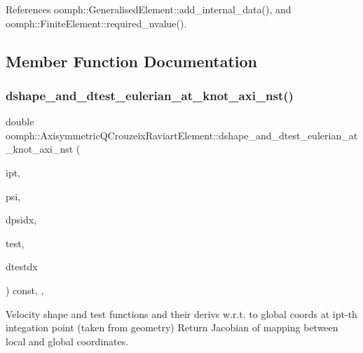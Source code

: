 References oomph\+::\+Generalised\+Element\+::add\+\_\+internal\+\_\+data(), and oomph\+::\+Finite\+Element\+::required\+\_\+nvalue().



\subsection{Member Function Documentation}
\mbox{\label{classoomph_1_1AxisymmetricQCrouzeixRaviartElement_a84026f3c225ef35731a04cc5866c7d6b}} 
\subsubsection{\texorpdfstring{dshape\+\_\+and\+\_\+dtest\+\_\+eulerian\+\_\+at\+\_\+knot\+\_\+axi\+\_\+nst()}{dshape\_and\_dtest\_eulerian\_at\_knot\_axi\_nst()}\hspace{0.1cm}{\footnotesize\ttfamily [1/2]}}
{\footnotesize\ttfamily double oomph\+::\+Axisymmetric\+Q\+Crouzeix\+Raviart\+Element\+::dshape\+\_\+and\+\_\+dtest\+\_\+eulerian\+\_\+at\+\_\+knot\+\_\+axi\+\_\+nst (\begin{DoxyParamCaption}\item[{const unsigned \&}]{ipt,  }\item[{\hyperlink{classoomph_1_1Shape}{Shape} \&}]{psi,  }\item[{\hyperlink{classoomph_1_1DShape}{D\+Shape} \&}]{dpsidx,  }\item[{\hyperlink{classoomph_1_1Shape}{Shape} \&}]{test,  }\item[{\hyperlink{classoomph_1_1DShape}{D\+Shape} \&}]{dtestdx }\end{DoxyParamCaption}) const\hspace{0.3cm}{\ttfamily [inline]}, {\ttfamily [protected]}, {\ttfamily [virtual]}}



Velocity shape and test functions and their derivs w.\+r.\+t. to global coords at ipt-\/th integation point (taken from geometry) Return Jacobian of mapping between local and global coordinates. 

